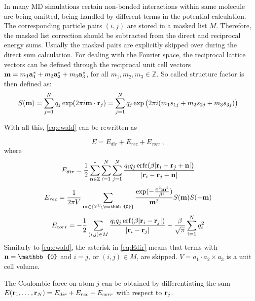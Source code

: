 \documentclass[12pt,a4paper]{report}
\newcommand{\draft}[1]{#1}
\DeclareMathOperator\erf{erf}
\DeclareMathOperator\erfc{erfc}
\begin{document}
In many MD simulations certain non-bonded interactions within same molecule are being omitted, being handled by different terms in the potential calculation. The corresponding particle pairs $(i, j)$ are stored in a masked list $M$. Therefore, the masked list correction should be subtracted from the direct and reciprocal energy sums. Usually the masked pairs are explicitly skipped over during the direct sum calculation.	 
For dealing with the Fourier space, the reciprocal lattice vectors can be defined through the reciprocal unit cell vectors $\bold{m} = m_1 \bold{a}_1^* + m_2 \bold{a}_2^* + m_3 \bold{a}_3^*$, for
all $m_1, m_2, m_3 \in \mathbb{Z}$. 
So called structure factor is then defined as:
\begin{equation} \label{eq:Sm}
 S(\bold{m}) = 
\sum\limits_{j=1}^Nq_j \exp(2\pi i\bold{m}\cdot\bold{r}_j)= 
\sum\limits_{j=1}^Nq_j \exp\big(2\pi i(m_1 s_{1j} + m_2 s_{2j}+m_3 s_{3j})\big)
\end{equation}

With all this, \eqref{eq:ewald} can be rewritten as

\[E = E_{dir} + E_{rec} + E_{corr}\,\mathrm{,}\]
where
\begin{equation} \label{eq:Edir}
E_{dir} = \frac{1}{2}\sum\limits_{\bold{n\in \mathbb{Z}}}^*\sum\limits_{i=1}^N\sum\limits_{j=1}^N\frac{q_i q_j \erfc(\beta\lvert\bold{r}_i - \bold{r}_j + \bold{n} \rvert)}{\lvert\bold{r}_i - \bold{r}_j + \bold{n} \rvert}
\end{equation}
\begin{equation} \label{eq:Erec}
E_{rec}=\frac{1}{2\pi V}\sum\limits_{\bold{m} \in \{\mathbb{Z}^3 \setminus \mathbb{0}\}}\frac{\exp(-\frac{\pi^2\bold{m}^2}{\beta^2})}{\bold{m}^2}S(\bold{m})S(\bold{-m})
\end{equation}
\[E_{corr} = -\frac{1}{2}\sum\limits_{(i,j)\in M}\frac{q_i q_j \erf(\beta\lvert\bold{r}_i - \bold{r}_j\rvert)}{\lvert\bold{r}_i - \bold{r}_j\rvert} - \frac{\beta}{\sqrt{\pi}}\sum\limits_{i=1}^N q_i^2\]
Similarly to \eqref{eq:ewald}, the asterisk in \eqref{eq:Edir} means that terms with $\bold{n} = \mathbb{0}$ and $i = j$, or $(i,j)\in M$, are skipped.
$V = a_1 \cdot a_2 \times a_3$ is a unit cell volume.

The Coulombic force on atom $j$ can be obtained by differentiating the sum $E(\bold{r}_1, \dotsc, \bold{r}_N) = E_{dir} + E_{rec} + E_{corr}$ with respect to $\bold{r}_j$. 

\end{document}
